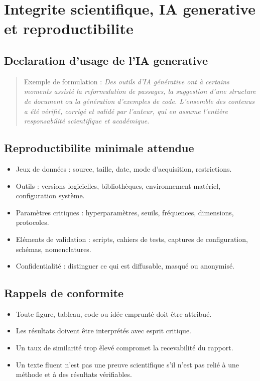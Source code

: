 \chapter{Integrite scientifique, IA generative et reproductibilite}

\section{Declaration d'usage de l'IA generative}

\begin{quote}
Exemple de formulation : \textit{Des outils d'IA g\'en\'erative ont \`a certains moments assist\'e la reformulation de passages, la suggestion d'une structure de document ou la g\'en\'eration d'exemples de code. L'ensemble des contenus a \'et\'e v\'erifi\'e, corrig\'e et valid\'e par l'auteur, qui en assume l'enti\`ere responsabilit\'e scientifique et acad\'emique.}
\end{quote}

\section{Reproductibilite minimale attendue}
\begin{itemize}[leftmargin=1.2cm]
\item Jeux de donn\'ees : source, taille, date, mode d'acquisition, restrictions.
\item Outils : versions logicielles, biblioth\`eques, environnement mat\'eriel, configuration syst\`eme.
\item Param\`etres critiques : hyperparam\`etres, seuils, fr\'equences, dimensions, protocoles.
\item El\'ements de validation : scripts, cahiers de tests, captures de configuration, sch\'emas, nomenclatures.
\item Confidentialit\'e : distinguer ce qui est diffusable, masqu\'e ou anonymis\'e.
\end{itemize}

\section{Rappels de conformite}
\begin{itemize}[leftmargin=1.2cm]
\item \okitem{} Toute figure, tableau, code ou id\'ee emprunt\'e doit \^etre attribu\'e.
\item \okitem{} Les r\'esultats doivent \^etre interpr\'et\'es avec esprit critique.
\item \warnitem{} Un taux de similarit\'e trop \^elev\'e compromet la recevabilit\'e du rapport.
\item \warnitem{} Un texte fluent n'est pas une preuve scientifique s'il n'est pas reli\'e \`a une m\'ethode et \`a des r\'esultats v\'erifiables.
\end{itemize}

